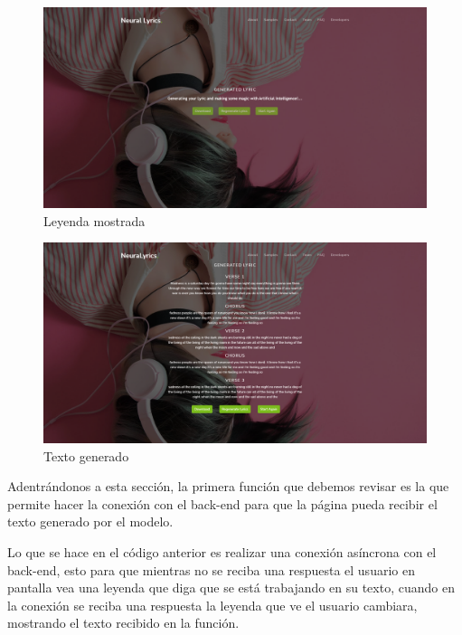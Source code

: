 \documentclass[12pt, a4paper, titlepage]{article}
\begin{document}
	\begin{figure}[H]
		\includegraphics[width=13.5cm]{./Imagenes/AplicacionWeb/pgenerating.png}
		\centering 
		\caption{Leyenda mostrada}
	\end{figure}
	\begin{figure}[H]
	\includegraphics[width=13.5cm]{./Imagenes/AplicacionWeb/Generated.png}
	\centering 
	\caption{Texto generado}
	\end{figure}
	Adentrándonos a esta sección, la primera función que debemos revisar es la que permite hacer la conexión con el back-end para que la página pueda recibir el texto generado por el modelo.
	\newpage
	\begin{center}
		
	\end{center}
	Lo que se hace en el código anterior es realizar una conexión asíncrona con el back-end, esto para que mientras no se reciba una respuesta el usuario en pantalla vea una leyenda que diga que se está trabajando en su texto, cuando en la conexión se reciba una respuesta la leyenda que ve el usuario cambiara, mostrando el texto recibido en la función.
	\begin{center}
		
	\end{center}
\end{document}

